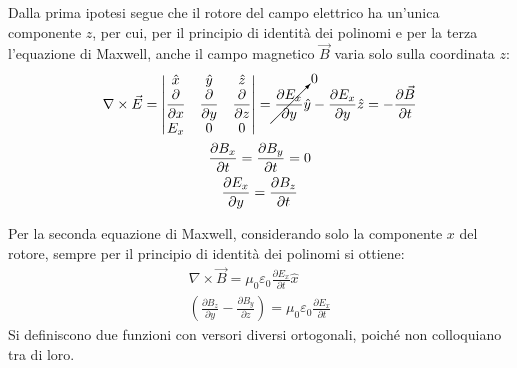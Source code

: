 \documentclass{article}
\numberwithin{equation}{subsection}
\begin{document}
Dalla prima ipotesi segue che il rotore del campo elettrico ha un'unica componente $z$, per cui, per il principio di identità dei polinomi e per la terza l'equazione di Maxwell, 
anche il campo magnetico $\vec{B}$ varia solo sulla coordinata $z$: 
\begin{gather*}
    \nabla\times\vec{E}=
    \begin{vmatrix}
        \hat{x} &\hat{y}&\hat{z}\\
        \displaystyle\frac{\partial}{\partial x}&\displaystyle\frac{\partial}{\partial y}&\displaystyle\frac{\partial}{\partial z}\\
        E_x&0&0
    \end{vmatrix}=
    \displaystyle\cancelto{0}{\frac{\partial E_x}{\partial y}}\hat{y}-\frac{\partial E_x}{\partial y}\hat{z}=-\frac{\partial \vec{B}}{\partial t}\\
    \displaystyle\frac{\partial B_x}{\partial t}=\frac{\partial B_y}{\partial t}=0\\
    \displaystyle\frac{\partial E_x}{\partial y}=\frac{\partial B_z}{\partial t}
\end{gather*}

Per la seconda equazione di Maxwell, considerando solo la componente $x$ del rotore, sempre per il principio di identità dei polinomi si ottiene:
\begin{gather*}
    \nabla\times\vec{B}=\mu_0\varepsilon_0\displaystyle\frac{\partial E_x}{\partial t}\hat{x}\\
    \left(\displaystyle\frac{\partial B_z}{\partial y}-\frac{\partial B_y}{\partial z}\right)=\mu_0\varepsilon_0\frac{\partial E_x}{\partial t}
\end{gather*}
Si definiscono due funzioni con versori diversi ortogonali, poiché non colloquiano tra di loro. 
\end{document}
